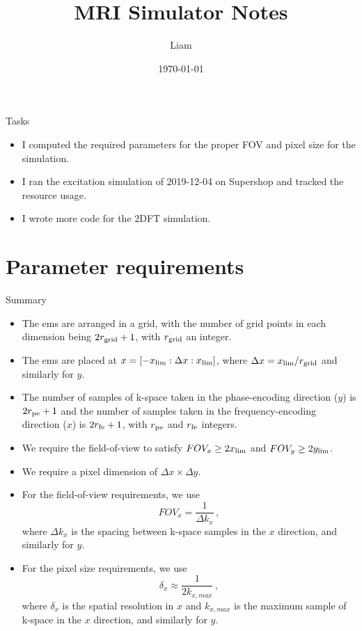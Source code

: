 \documentclass[dvipsnames]{beamer}
\title{MRI Simulator Notes}
\author{Liam}
\date{\today}
\begin{document}
\begin{frame}
\maketitle
\end{frame}

\begin{frame}{Tasks}
\begin{itemize}
\item I computed the required parameters for the proper FOV and pixel size for the simulation.
\item I ran the excitation simulation of 2019-12-04 on Supershop and tracked the resource usage.
\item I wrote more code for the 2DFT simulation.
\end{itemize}
\end{frame}

\section{Parameter requirements}

\begin{frame}{Summary}
\begin{itemize}
\item The ems are arranged in a grid, with the number of grid points in each dimension being $2r_{\rm grid}+1$, with $r_{\rm grid}$ an integer.
\item The ems are placed at $x = [-x_{\rm lim}: \Delta x: x_{\rm lim}]$, where $\Delta x = x_{\rm lim}/r_{\rm grid}$ and similarly for $y$.
\item The number of samples of k-space taken in the phase-encoding direction ($y$) is $2r_{\rm pe}+1$ and the number of samples taken in the frequency-encoding direction ($x$) is $2r_{\rm fe}+1$, with $r_{\rm pe}$ and $r_{\rm fe}$ integers.
\item We require the field-of-view to satisfy $FOV_x \geq 2x_{\rm lim}$ and $FOV_y \geq 2y_{\rm lim}$.
\item We require a pixel dimension of $\Delta x \times \Delta y$.
\end{itemize}
\end{frame}

\begin{frame}
\begin{itemize}
\item For the field-of-view requirements, we use
\begin{equation*}
FOV_x = \frac{1}{\Delta k_x}\,,
\end{equation*}
where $\Delta k_x$ is the spacing between k-space samples in the $x$ direction, and similarly for $y$.
\item For the pixel size requirements, we use
\begin{equation*}
\delta_x \approx \frac{1}{2k_{x,max}}\,,
\end{equation*}
where $\delta_x$ is the spatial resolution in $x$ and $k_{x,max}$ is the maximum sample of k-space in the $x$ direction, and similarly for $y$.
\end{itemize}
\end{frame}
\end{document}
